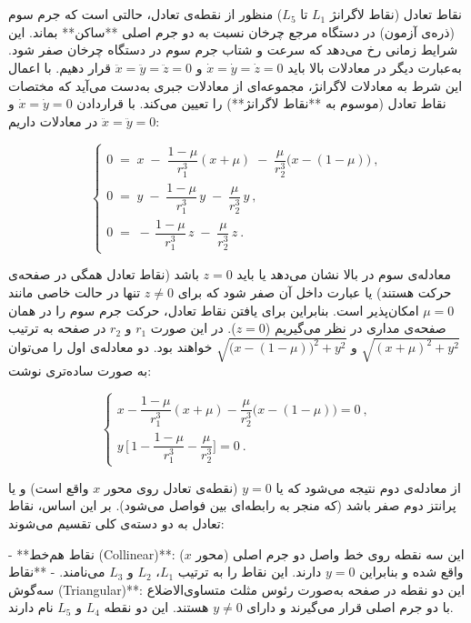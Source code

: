 \section{} نقاط تعادل (نقاط لاگرانژ $L_1$ تا $L_5$)  
منظور از نقطه‌ی تعادل، حالتی است که جرم سوم (ذره‌ی آزمون) در دستگاه مرجع چرخان نسبت به دو جرم اصلی **ساکن** بماند. این شرایط زمانی رخ می‌دهد که سرعت و شتاب جرم سوم در دستگاه چرخان صفر شود. به‌عبارت دیگر در معادلات بالا باید $\dot{x}=\dot{y}=\dot{z}=0$ و $\ddot{x}=\ddot{y}=\ddot{z}=0$ قرار دهیم. با اعمال این شرط به معادلات لاگرانژ، مجموعه‌ای از معادلات جبری به‌دست می‌آید که مختصات نقاط تعادل (موسوم به **نقاط لاگرانژ**) را تعیین می‌کند. با قراردادن $\dot{x}=\dot{y}=0$ و $\ddot{x}=\ddot{y}=0$ در معادلات داریم:

$$ 
\begin{cases}
	\displaystyle 0 \;=\; x \;-\; \dfrac{1-\mu}{r_1^3}(x+\mu) \;-\; \dfrac{\mu}{r_2^3}\Big(x-(1-\mu)\Big)~,  \\[2ex]
	\displaystyle 0 \;=\; y \;-\; \dfrac{1-\mu}{r_1^3}\,y \;-\; \dfrac{\mu}{r_2^3}\,y~,  \\[1ex]
	0 \;=\; -\,\dfrac{1-\mu}{r_1^3}\,z \;-\; \dfrac{\mu}{r_2^3}\,z~. 
\end{cases}
$$

معادله‌ی سوم در بالا نشان می‌دهد یا باید $z=0$ باشد (نقاط تعادل همگی در صفحه‌ی حرکت هستند) یا عبارت داخل آن صفر شود که برای $z\neq0$ تنها در حالت خاصی مانند $\mu=0$ امکان‌پذیر است. بنابراین برای یافتن نقاط تعادل، حرکت جرم سوم را در همان صفحه‌ی مداری در نظر می‌گیریم ($z=0$). در این صورت $r_1$ و $r_2$ در صفحه به ترتیب $\sqrt{(x+\mu)^2+y^2}$ و $\sqrt{\big(x-(1-\mu)\big)^2+y^2}$ خواهند بود. دو معادله‌ی اول را می‌توان به صورت ساده‌تری نوشت:

$$ 
\begin{cases}
	\displaystyle x - \dfrac{1-\mu}{r_1^3}(x+\mu) - \dfrac{\mu}{r_2^3}\Big(x-(1-\mu)\Big) = 0~,  \\[2ex]
	\displaystyle y\,\Big[\,1 - \dfrac{1-\mu}{r_1^3} - \dfrac{\mu}{r_2^3}\Big] = 0~. 
\end{cases}
$$

از معادله‌ی دوم نتیجه می‌شود که یا $y=0$ (نقطه‌ی تعادل روی محور $x$ واقع است) و یا پرانتز دوم صفر باشد (که منجر به رابطه‌ای بین فواصل می‌شود). بر این اساس، نقاط تعادل به دو دسته‌ی کلی تقسیم می‌شوند:

- **نقاط هم‌خط (Collinear)**: این سه نقطه روی خط واصل دو جرم اصلی (محور $x$) واقع شده و بنابراین $y=0$ دارند. این نقاط را به ترتیب $L_1$، $L_2$ و $L_3$ می‌نامند.  
- **نقاط سه‌گوش (Triangular)**: این دو نقطه در صفحه به‌صورت رئوس مثلث متساوی‌الاضلاع با دو جرم اصلی قرار می‌گیرند و دارای $y\neq0$ هستند. این دو نقطه $L_4$ و $L_5$ نام دارند.  

